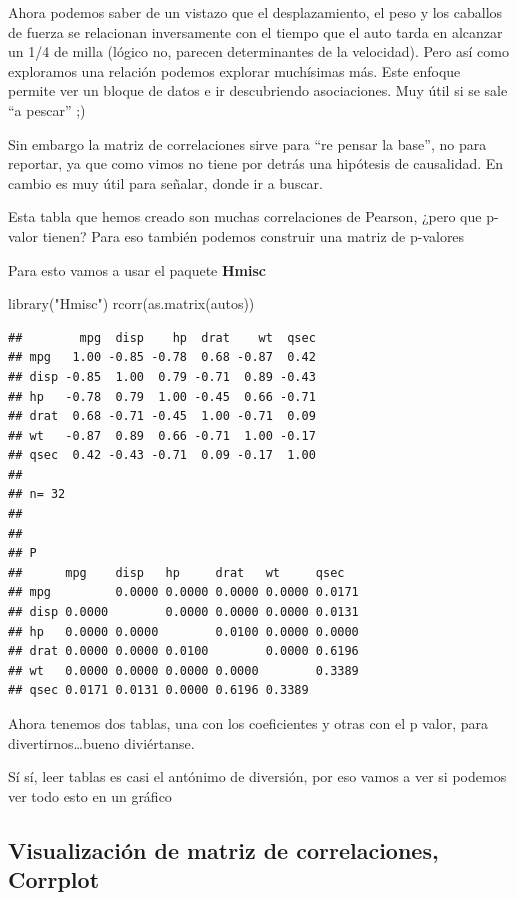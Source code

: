 \documentclass[
]{book}
\newenvironment{Shaded}{\begin{snugshade}}{\end{snugshade}}
\newcommand{\FunctionTok}[1]{\textcolor[rgb]{0.00,0.00,0.00}{#1}}
\newcommand{\NormalTok}[1]{#1}
\newcommand{\StringTok}[1]{\textcolor[rgb]{0.31,0.60,0.02}{#1}}
\begin{document}
Ahora podemos saber de un vistazo que el desplazamiento, el peso y los caballos de fuerza se relacionan inversamente con el tiempo que el auto tarda en alcanzar un 1/4 de milla (lógico no, parecen determinantes de la velocidad). Pero así como exploramos una relación podemos explorar muchísimas más. Este enfoque permite ver un bloque de datos e ir descubriendo asociaciones. Muy útil si se sale ``a pescar'' ;)

Sin embargo la matriz de correlaciones sirve para ``re pensar la base'', no para reportar, ya que como vimos no tiene por detrás una hipótesis de causalidad. En cambio es muy útil para señalar, donde ir a buscar.

Esta tabla que hemos creado son muchas correlaciones de Pearson, ¿pero que p-valor tienen? Para eso también podemos construir una matriz de p-valores

Para esto vamos a usar el paquete \textbf{Hmisc}

\begin{Shaded}
\begin{Highlighting}[]
\FunctionTok{library}\NormalTok{(}\StringTok{"Hmisc"}\NormalTok{)}
 \FunctionTok{rcorr}\NormalTok{(}\FunctionTok{as.matrix}\NormalTok{(autos))}
\end{Highlighting}
\end{Shaded}

\begin{verbatim}
##        mpg  disp    hp  drat    wt  qsec
## mpg   1.00 -0.85 -0.78  0.68 -0.87  0.42
## disp -0.85  1.00  0.79 -0.71  0.89 -0.43
## hp   -0.78  0.79  1.00 -0.45  0.66 -0.71
## drat  0.68 -0.71 -0.45  1.00 -0.71  0.09
## wt   -0.87  0.89  0.66 -0.71  1.00 -0.17
## qsec  0.42 -0.43 -0.71  0.09 -0.17  1.00
## 
## n= 32 
## 
## 
## P
##      mpg    disp   hp     drat   wt     qsec  
## mpg         0.0000 0.0000 0.0000 0.0000 0.0171
## disp 0.0000        0.0000 0.0000 0.0000 0.0131
## hp   0.0000 0.0000        0.0100 0.0000 0.0000
## drat 0.0000 0.0000 0.0100        0.0000 0.6196
## wt   0.0000 0.0000 0.0000 0.0000        0.3389
## qsec 0.0171 0.0131 0.0000 0.6196 0.3389
\end{verbatim}

Ahora tenemos dos tablas, una con los coeficientes y otras con el p valor, para divertirnos\ldots bueno diviértanse.

Sí sí, leer tablas es casi el antónimo de diversión, por eso vamos a ver si podemos ver todo esto en un gráfico

\hypertarget{visualizaciuxf3n-de-matriz-de-correlaciones-corrplot}{%
\subsection{Visualización de matriz de correlaciones, Corrplot}\label{visualizaciuxf3n-de-matriz-de-correlaciones-corrplot}}
\end{document}
